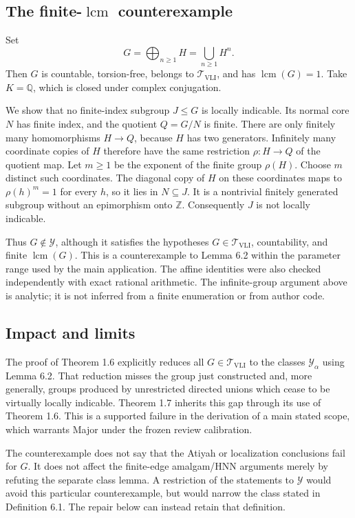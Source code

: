 \documentclass[10pt]{article}
\begin{document}
\subsection*{The finite-\(\operatorname{lcm}\) counterexample}
Set \[G=\bigoplus_{n\geq1}H=\bigcup_{n\geq1}H^n .\] Then \(G\) is countable, torsion-free, belongs to \(\mathcal T_{\mathrm{VLI}}\), and has \(\operatorname{lcm}(G)=1\). Take \(K=\mathbb Q\), which is closed under complex conjugation.\par
We show that no finite-index subgroup \(J\leq G\) is locally indicable. Its normal core \(N\) has finite index, and the quotient \(Q=G/N\) is finite. There are only finitely many homomorphisms \(H\to Q\), because \(H\) has two generators. Infinitely many coordinate copies of \(H\) therefore have the same restriction \(\rho:H\to Q\) of the quotient map. Let \(m\geq1\) be the exponent of the finite group \(\rho(H)\). Choose \(m\) distinct such coordinates. The diagonal copy of \(H\) on these coordinates maps to \(\rho(h)^m=1\) for every \(h\), so it lies in \(N\subseteq J\). It is a nontrivial finitely generated subgroup without an epimorphism onto \(\mathbb Z\). Consequently \(J\) is not locally indicable.\par
Thus \(G\notin\mathcal Y\), although it satisfies the hypotheses \(G\in\mathcal T_{\mathrm{VLI}}\), countability, and finite \(\operatorname{lcm}(G)\). This is a counterexample to Lemma 6.2 within the parameter range used by the main application. The affine identities were also checked independently with exact rational arithmetic. The infinite-group argument above is analytic; it is not inferred from a finite enumeration or from author code.\par
\subsection*{Impact and limits}
The proof of Theorem 1.6 explicitly reduces all \(G\in\mathcal T_{\mathrm{VLI}}\) to the classes \(\mathcal Y_\alpha\) using Lemma 6.2. That reduction misses the group just constructed and, more generally, groups produced by unrestricted directed unions which cease to be virtually locally indicable. Theorem 1.7 inherits this gap through its use of Theorem 1.6. This is a supported failure in the derivation of a main stated scope, which warrants Major under the frozen review calibration.\par
The counterexample does not say that the Atiyah or localization conclusions fail for \(G\). It does not affect the finite-edge amalgam/HNN arguments merely by refuting the separate class lemma. A restriction of the statements to \(\mathcal Y\) would avoid this particular counterexample, but would narrow the class stated in Definition 6.1. The repair below can instead retain that definition.\par
\end{document}
